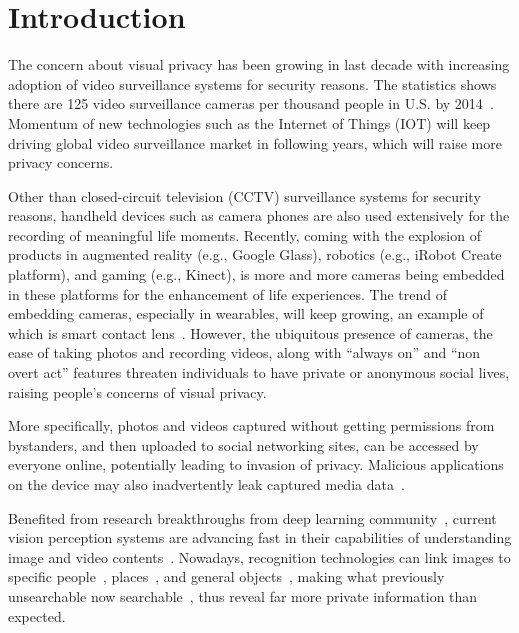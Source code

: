 \chapter{Introduction}\label{sec-introduction}

The concern about visual privacy has been growing in last decade with increasing adoption of video surveillance systems for security reasons. The statistics shows there are 125 video surveillance cameras per thousand people in U.S. by 2014~\cite{links:numofsurv}. Momentum of new technologies such as the Internet of Things (IOT) will keep driving global video surveillance market in following years, which will raise more privacy concerns.

Other than closed-circuit television (CCTV) surveillance systems for security reasons, handheld devices such as camera phones are also used extensively for the recording of meaningful life moments. Recently, coming with the explosion of products in augmented reality (e.g., Google Glass), robotics (e.g., iRobot Create platform), and gaming (e.g., Kinect), is more and more cameras being embedded in these platforms for the enhancement of life experiences. The trend of embedding cameras, especially in wearables, will keep growing, an example of which is smart contact lens~\cite{links:eyecontact}. However, the ubiquitous presence of cameras, the ease of taking photos and recording videos, along with ``always on'' and ``non overt act'' features threaten individuals to have private or anonymous social lives, raising people's concerns of visual privacy.

More specifically, photos and videos captured without getting permissions from bystanders, and then uploaded to social networking sites, can be accessed by everyone online, potentially leading to invasion of privacy. Malicious applications on the device may also inadvertently leak captured media data~\cite{links:appleakspriv}.

Benefited from research breakthroughs from deep learning community~\cite{Goodfellow-et-al-2016-Book}, current vision perception systems are advancing fast in their capabilities of understanding image and video contents~\cite{links:awesomedeepvision}. Nowadays, recognition technologies can link images to specific people~\cite{taigman2014deepface,sun2015deepid3,schroff2015facenet}, places~\cite{weyand2016planet}, and general objects~\cite{russakovsky2015imagenet}, making what previously unsearchable now searchable~\cite{acquisti2014face}, thus reveal far more private information than expected.


